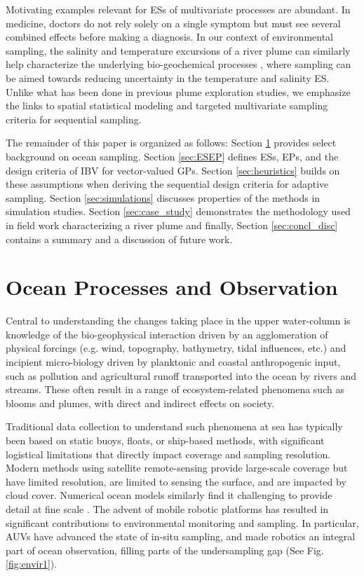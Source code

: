 \documentclass[aoas]{imsart}
\begin{document}
Motivating examples relevant for ESs of multivariate processes are
abundant. In medicine, doctors do not rely solely on a single symptom
but must see several combined effects before making a diagnosis. In
our context of environmental sampling, the salinity and temperature
excursions of a river plume can similarly help characterize the
underlying bio-geochemical processes
\citep{hopkins2013detection,Pinto2018}, where sampling can be aimed
towards reducing uncertainty in the temperature and salinity ES.
Unlike what has been done in previous plume exploration studies, we
emphasize the links to spatial statistical modeling and targeted
multivariate sampling criteria for sequential sampling.

The remainder of this paper is organized as follows: Section
\ref{sec:bg} provides select background on ocean sampling. Section
\ref{sec:ESEP} defines ESs, EPs, and the design criteria of IBV for
vector-valued GPs. Section \ref{sec:heuristics} builds on these
assumptions when deriving the sequential design criteria for adaptive
sampling. Section \ref{sec:simulations} discusses properties of the
methods in simulation studies. Section \ref{sec:case_study}
demonstrates the methodology used in field work characterizing a river
plume and finally, Section \ref{sec:concl_disc} contains a summary and
a discussion of future work.

\section{Ocean Processes and Observation}
\label{sec:bg}

Central to understanding the changes taking place in the upper
water-column is knowledge of the bio-geophysical interaction driven by
an agglomeration of physical forcings (e.g. wind, topography,
bathymetry, tidal influences, etc.) and incipient micro-biology driven
by planktonic and coastal anthropogenic input, such as pollution and
agricultural runoff transported into the ocean by rivers and streams.
These often result in a range of ecosystem-related phenomena such as
blooms and plumes, with direct and indirect effects on society. 

Traditional data collection to understand such phenomena at sea has
typically been based on static buoys, floats, or ship-based methods,
with significant logistical limitations that directly impact coverage
and sampling resolution. Modern methods using satellite remote-sensing
provide large-scale coverage but have limited resolution, are limited
to sensing the surface, and are impacted by cloud cover. Numerical
ocean models similarly find it challenging to provide detail at fine
scale \citep{Lermusiaux:2006}. The advent of mobile robotic platforms
\citep{Bellingham07} has resulted in significant contributions to
environmental monitoring and sampling. In particular, AUVs have
advanced the state of in-situ sampling, and made robotics an integral
part of ocean observation, filling parts of the undersampling gap
\cite{rudnick03,rudnick18}(See Fig. \ref{fig:envir1}).
\end{document}
